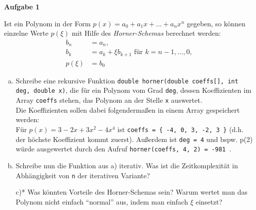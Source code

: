 \documentclass[a4paper,12pt,parskip=full]{scrartcl}
\newcommand{\Aufgabe}[1]{
  {
    \vspace*{0.5cm}
    \textsf{\textbf{Aufgabe #1}}
    \vspace*{0.2cm}
    
  }
}
\begin{document}
\newpage
\Aufgabe{1} Ist ein Polynom in der Form
$p(x) = a_0 + a_1 x + \dots + a_nx^n$ gegeben, so können einzelne
Werte $p(\xi)$ mit Hilfe des \emph{Horner-Schemas} berechnet werden:
\begin{align*}
  b_n &= a_n, \\
  b_k &= a_k + \xi b_{k+1} \text{ für } k = n-1, \dots, 0, \\
  p(\xi) &= b_0
\end{align*}
\begin{enumerate}[a)\ ]
\item
  Schreibe eine rekursive Funktion \lstinline{double horner(double coeffs[], int deg, double x)}, die für ein Polynom vom Grad \lstinline{deg}, dessen Koeffizienten im Array \lstinline{coeffs} stehen, das Polynom an der Stelle \lstinline{x} auswertet. \\
  Die Koeffizienten sollen dabei folgendermaßen in einem Array gespeichert werden: \\
  Für $p(x) = 3 - 2x + 3x^2 - 4x^4$ ist \lstinline|coeffs = { -4, 0, 3, -2, 3 }|
  (d.h. der höchste Koeffizient kommt zuerst). Außerdem
  ist \lstinline{deg = 4} und bspw. p(2) würde ausgewertet durch den
  Aufruf \lstinline{horner(coeffs, 4, 2) = -981 }.
  
\item Schreibe nun die Funktion aus a) iterativ. Was ist die
  Zeitkomplexität in Abhängigkeit von \texttt{n} der iterativen
  Variante?
\item[c)*] Was könnten Vorteile des Horner-Schemas sein? Warum wertet
  man das Polynom nicht einfach ``normal'' aus, indem man einfach
  $\xi$ einsetzt?
\end{enumerate}
\end{document}
